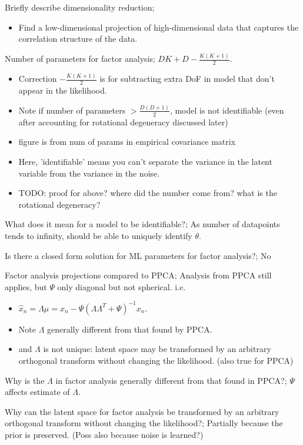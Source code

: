 \documentclass{article}
\begin{document}
Briefly describe dimensionality reduction; \begin{itemize}
	\item Find a low-dimensional projection of high-dimensional data that captures the correlation structure of the data.
\end{itemize}

Number of parameters for factor analysis; $DK + D - \frac{K(K+1)}{2}$. \begin{itemize}
	\item Correction $- \frac{K(K+1)}{2}$ is for subtracting extra DoF in model that don't appear in the likelihood.
	\item Note if number of parameters $> \frac{D(D+1)}{2}$, model is not identifiable (even after accounting for rotational degeneracy discussed later)
	\item figure is from num of params in empirical covariance matrix
	\item Here, 'identifiable' means you can't separate the variance in the latent variable from the variance in the noise.
	\item TODO: proof for above? where did the number come from? what is the rotational degeneracy?
\end{itemize}

What does it mean for a model to be identifiable?; As number of datapoints tends to infinity, should be able to uniquely identify $\theta$.

Is there a closed form solution for ML parameters for factor analysis?; No

Factor analysis projections compared to PPCA; Analysis from PPCA still applies, but $\Psi$ only diagonal but not spherical. i.e. \begin{itemize}
	\item $\hat{x}_n=\Lambda\mu=x_n - \Psi(\Lambda\Lambda^T+\Psi)^{-1}x_n$.
	\item Note $\Lambda$ generally different from that found by PPCA.
	\item and $\Lambda$ is not unique: latent space may be transformed by an arbitrary orthogonal transform without changing the likelihood. (also true for PPCA)
\end{itemize}

Why is the $\Lambda$ in factor analysis generally different from that found in PPCA?; $\Psi$ affects estimate of $\Lambda$.

Why can the latent space for factor analysis be transformed by an arbitrary orthogonal transform without changing the likelihood?; Partially because the prior is preserved. (Poss also because noise is learned?)
\end{document}
